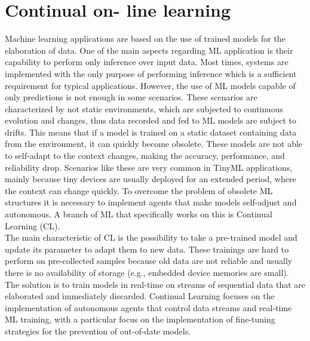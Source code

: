 \documentclass[12pt]{report}
\begin{document}
\section{Continual on- line learning}
Machine learning applications are based on the use of trained models for the elaboration of data. One of the main aspects regarding ML application is their capability to perform only inference over input data. Most times, systems are implemented with the only purpose of performing inference which is a sufficient requirement for typical applications. However, the use of ML models capable of only predictions is not enough in some scenarios. These scenarios are characterized by not static environments, which are subjected to continuous evolution and changes, thus data recorded and fed to ML models are subject to drifts. This means that if a model is trained on a static dataset containing data from the environment, it can quickly become obsolete. These models are not able to self-adapt to the context changes, making the accuracy, performance, and reliability drop. Scenarios like these are very common in TinyML applications, mainly because tiny devices are usually deployed for an extended period, where the context can change quickly. To overcome the problem of obsolete ML structures it is necessary to implement agents that make models self-adjust and autonomous. A branch of ML that specifically works on this is Continual Learning (CL). \\
The main characteristic of CL is the possibility to take a pre-trained model and update its parameter to adapt them to new data. These trainings are hard to perform on pre-collected samples because old data are not reliable and usually there is no availability of storage (e.g., embedded device memories are small). The solution is to train models in real-time on streams of sequential data that are elaborated and immediately discarded. Continual Learning focuses on the implementation of autonomous agents that control data streams and real-time ML training, with a particular focus on the implementation of fine-tuning strategies for the prevention of out-of-date models.\\
\end{document}
